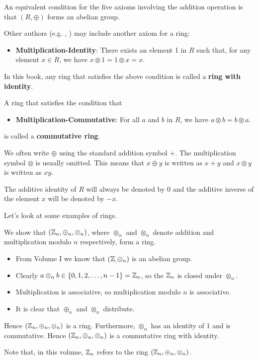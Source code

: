 \begin{remark}
    An equivalent condition for the five axioms involving the addition operation is that $(R, \oplus)$ forms an abelian group.
\end{remark}
\begin{remark}
    Other authors (e.g. \cite[p.~136]{cohn_1982}, \cite[pp.~145--146]{clark_1984}) may include another axiom for a ring:
    \begin{itemize}
        \item \textbf{Multiplication-Identity}: There exists an element 1 in $R$ such that, for any element $x \in R$, we have $x \otimes 1 = 1 \otimes x = x$.
    \end{itemize}
    In this book, any ring that satisfies the above condition is called a \textbf{ring with identity}.
\end{remark}
\begin{remark}
    A ring that satisfies the condition that
    \begin{itemize}
        \item \textbf{Multiplication-Commutative}: For all $a$ and $b$ in $R$, we have $a \otimes b = b \otimes a$.
    \end{itemize}
    is called a \textbf{commutative ring}.
\end{remark}

We often write $\oplus$ using the standard addition symbol $+$. The multiplication symbol $\otimes$ is usually omitted. This means that $x \oplus y$ is written as $x + y$ and $x \otimes y$ is written as $xy$.

The additive identity of $R$ will always be denoted by 0 and the additive inverse of the element $x$ will be denoted by $-x$.

\newpage

Let's look at some examples of rings.
\begin{example}
    We show that $(\mathbb{Z}_{n}, \oplus_n, \otimes_n)$, where $\oplus_n$ and $\otimes_n$ denote addition and multiplication modulo $n$ respectively, form a ring.
    \begin{itemize}
        \item From Volume I we know that $(\mathbb{Z}_{,} \oplus_n)$ is an abelian group.
        \item Clearly $a \otimes_n b \in \{0, 1, 2, \dots, n-1\} = \mathbb{Z}_{n}$, so the $\mathbb{Z}_{n}$ is closed under $\otimes_n$.
        \item Multiplication is associative, so multiplication modulo $n$ is associative.
        \item It is clear that $\oplus_n$ and $\otimes_n$ distribute.
    \end{itemize}
    Hence $(\mathbb{Z}_{n}, \oplus_n, \otimes_n)$ is a ring. Furthermore, $\otimes_n$ has an identity of 1 and is commutative. Hence $(\mathbb{Z}_{n}, \oplus_n, \otimes_n)$ is a commutative ring with identity.

    Note that, in this volume, $\mathbb{Z}_{n}$ refers to the ring $(\mathbb{Z}_{n}, \oplus_n, \otimes_n)$.
\end{example}


